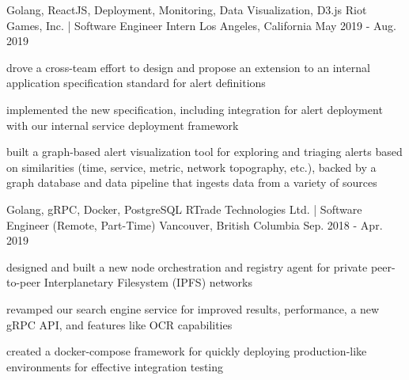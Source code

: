 

\begin{cventries}

  \cventry
    {Golang, ReactJS, Deployment, Monitoring, Data Visualization, D3.js} %
    {Riot Games, Inc. | Software Engineer Intern} %
    {Los Angeles, California} %
    {May 2019 - Aug. 2019} %
    {
      \begin{cvitems} %
        \item {drove a cross-team effort to design and propose an extension to an internal application specification standard for alert definitions}
        \item{implemented the new specification, including integration for alert deployment with our internal service deployment framework}
        \item {built a graph-based alert visualization tool for exploring and triaging alerts based on similarities (time, service, metric, network topography, etc.), backed by a graph database and data pipeline that ingests data from a variety of sources}
      \end{cvitems}
    }

  \cventry
    {Golang, gRPC, Docker, PostgreSQL} %
    {RTrade Technologies Ltd. | Software Engineer (Remote, Part-Time)} %
    {Vancouver, British Columbia} %
    {Sep. 2018 - Apr. 2019} %
    {
      \begin{cvitems} %
        \item {designed and built a new node orchestration and registry agent for private  peer-to-peer Interplanetary Filesystem (IPFS) networks}
        \item {revamped our search engine service for improved results, performance, a new gRPC API, and features like OCR capabilities}
        \item {created a docker-compose framework for quickly deploying production-like environments for effective integration testing}
      \end{cvitems}
    }


\end{cventries}
